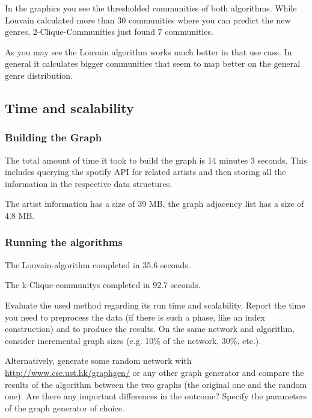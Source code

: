 \documentclass[11pt,a4paper,onecolumn,notitlepage]{article}
\begin{document}
In the graphics you see the thresholded communities of both algorithms. While Louvain calculated more than 30 communities where you can predict the new genres, 2-Clique-Communities just found 7 communities.

As you may see the Louvain algorithm works much better in that use case. In general it calculates bigger communities that seem to map better on the general genre distribution.


\subsection{Time and scalability}

\subsubsection*{Building the Graph}

The total amount of time it took to build the graph is 14 minutes 3 seconds. This includes querying the spotify API for related artists and then storing all the information in the respective data structures.

The artist information has a size of 39 MB, the graph adjacency list has a size of 4.8 MB.

\subsubsection*{Running the algorithms}

The Louvain-algorithm completed in 35.6 seconds.


The k-Clique-communitys completed in 92.7 seconds.

Evaluate the used method regarding its run time and scalability. Report the time you need to preprocess the data (if there is such a phase, like an index construction) and to produce the results. On the same network and algorithm, consider incremental graph sizes (e.g. 10\% of the network, 30\%, etc.). 

\smallskip
\noindent Alternatively, generate some random network with \url{http://www.cse.ust.hk/graphgen/} or any other graph generator and compare the results of the algorithm between the two graphs (the original one and the random one). Are there any important differences in the outcome? Specify the parameters of the graph generator of choice. 
\end{document}

